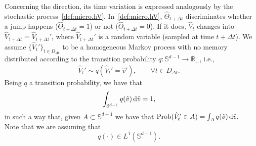 \documentclass[a4paper]{article}
\theoremstyle{Theorem}\newtheorem{proposition}{Proposition}[section]
\theoremstyle{Remark}\newtheorem{remark}{Remark}[section]
\theoremstyle{Theorem}\newtheorem{theorem}{Theorem}[section]
\newcommand{\R}{\mathbb{R}}
\newcommand{\hv}{\hat{v}}
\newcommand{\hV}{\hat{V}}
\newcommand{\intS}{\int_{\mathbb{S}^{d-1}}}
\begin{document}
Concerning the direction, its time variation is expressed analogously by the stochastic process~\eqref{def:micro.hV}. In~\eqref{def:micro.hV}, $\hat{\Theta}_{t+\Delta t}$ discriminates whether a jump happens ($\hat{\Theta}_{t+\Delta t}=1$) or not ($\hat{\Theta}_{t+\Delta t}=0$). If it does, $\hV_{t}$ changes into $\hV_{t+\Delta t}=\hV_{t+\Delta t}'$, where $\hV_{t+\Delta t}'$ is a random variable (sampled at time $t+\Delta t$). We assume $\lbrace\hV_{t}'\rbrace_{t\in D_{\Delta t}}$ to be a homogeneous Markov process with no memory distributed according to the transition probability $q: \mathbb{S}^{d-1} \to \R_+$, i.e.,
\begin{equation}\label{def:q}
\hV_t' \sim q(\hV_t'=\hv'), \qquad \forall t \in D_{\Delta t}.
\end{equation}
Being $q$ a transition probability, we have that
\begin{equation}\label{norm.q}
\intS q(\hv) \, {\rm d} \hv =1,
\end{equation}
in such a way that, given $A \subset \mathbb{S}^{d-1}$ we have that ${\rm Prob}(\hV_t'\in A)= \int_A q(\hv) \, {\rm d}\hv.$
Note that we are assuming that
\begin{equation}\label{q.L1}
    q(\cdot) \in L^1(\mathbb{S}^{d-1}). 
\end{equation}
\end{document}
